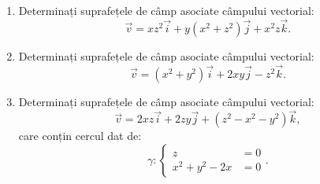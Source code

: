 \begin{enumerate}
\item Determinați suprafețele de câmp asociate câmpului vectorial:
  \[
    \vec{v} = xz^2 \vec{i} + y(x^2 + z^2)\vec{j} + x^2 z \vec{k}.
  \]

\item Determinați suprafețele de câmp asociate câmpului vectorial:
  \[
    \vec{v} = (x^2 + y^2) \vec{i} + 2xy \vec{j} - z^2 \vec{k}.
  \]

\item Determinați suprafețele de câmp asociate câmpului vectorial:
  \[
    \vec{v} = 2xz\vec{i} + 2zy \vec{j} + (z^2 - x^2 - y^2) \vec{k},
  \]
  care conțin cercul dat de:
  \[
    \gamma: \begin{cases}
      z &= 0 \\
      x^2 + y^2 - 2x &= 0
    \end{cases}.
  \]
\end{enumerate}
